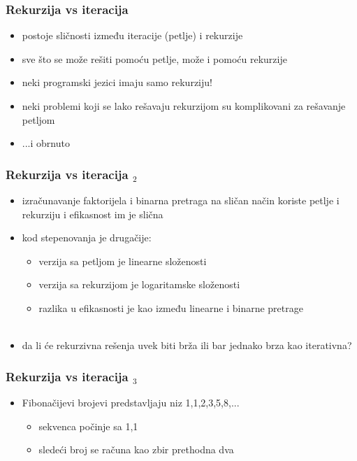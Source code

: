 \documentclass[utf8,compress,aspectratio=169]{beamer}
\begin{document}
\begin{frame}[fragile]
  \frametitle{Rekurzija vs iteracija}
  \begin{itemize}
    \item postoje sličnosti između iteracije (petlje) i rekurzije
    \item sve što se može rešiti pomoću petlje, može i pomoću rekurzije
    \item neki programski jezici imaju samo rekurziju!
    \item neki problemi koji se lako rešavaju rekurzijom su komplikovani za rešavanje petljom
    \item ...i obrnuto
  \end{itemize}
\end{frame}

\begin{frame}[fragile]
  \frametitle{Rekurzija vs iteracija $_2$}
  \begin{itemize}
    \item izračunavanje faktorijela i binarna pretraga na sličan način koriste petlje i rekurziju i efikasnost im je slična
    \item kod stepenovanja je drugačije:
  \begin{itemize}
    \item verzija sa petljom je linearne složenosti
    \item verzija sa rekurzijom je logaritamske složenosti
    \item razlika u efikasnosti je kao između linearne i binarne pretrage \\ \ \\
  \end{itemize}
    \item da li će rekurzivna rešenja uvek biti brža ili bar jednako brza kao iterativna?
  \end{itemize}
\end{frame}

\begin{frame}[fragile]
  \frametitle{Rekurzija vs iteracija $_3$}
  \begin{itemize}
    \item Fibonačijevi brojevi predstavljaju niz 1,1,2,3,5,8,...
  \begin{itemize}
    \item sekvenca počinje sa 1,1
    \item sledeći broj se računa kao zbir prethodna dva
  \end{itemize}
  \end{itemize}
\end{frame}
\end{document}
